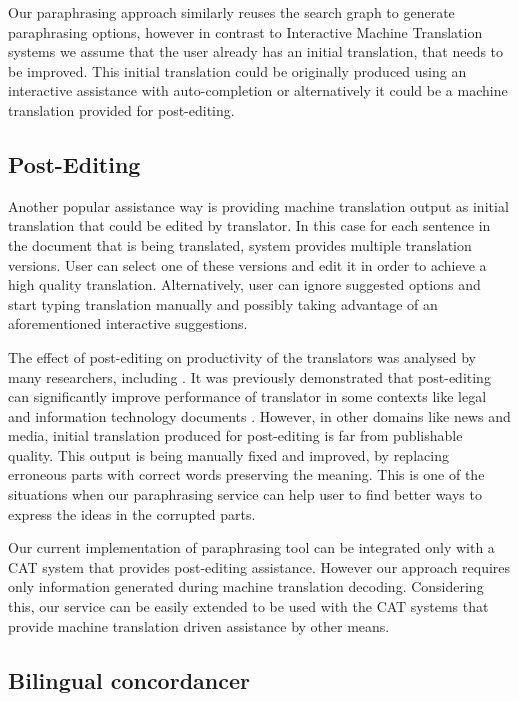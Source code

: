 Our paraphrasing approach similarly reuses the search graph to generate paraphrasing options, however in contrast to Interactive Machine Translation systems we assume that the user already has an initial translation, that needs to be improved. This initial translation could be originally produced using an interactive assistance with auto-completion or alternatively it could be a machine translation provided for post-editing.

\subsection{Post-Editing}

Another popular assistance way is providing machine translation output as initial translation that could be edited by translator. In this case for each sentence in the document that is being translated, system provides multiple translation versions. User can select one of these versions and edit it in order to achieve a high quality translation. Alternatively, user can ignore suggested options and start typing translation manually and possibly taking advantage of an aforementioned interactive suggestions.  

The effect of post-editing on productivity of the translators was analysed by many researchers, including \cite{guerberof2009productivity}. It was previously demonstrated that post-editing can significantly improve performance of translator in some contexts like legal and information technology documents \citep{federico2012measuring}. However, in other domains like news and media, initial translation produced for post-editing is far from publishable quality. This output is being manually fixed and improved, by replacing erroneous parts with correct words preserving the meaning. This is one of the situations when our paraphrasing service can help user to find better ways to express the ideas in the corrupted parts.

Our current implementation of paraphrasing tool can be integrated only with a CAT system that provides post-editing assistance. However our approach requires only information generated during machine translation decoding. Considering this, our service can be easily extended to be used with the CAT systems that provide machine translation driven assistance by other means.

\subsection{Bilingual concordancer}

